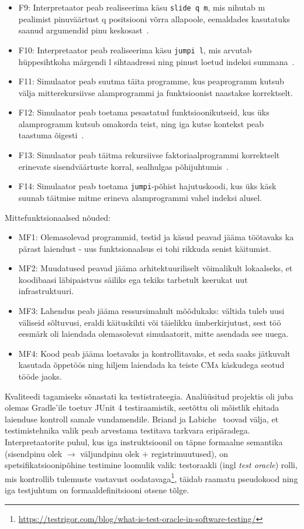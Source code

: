 \begin{itemize}
	\item F9: Interpretaator peab realiseerima käsu \verb|slide q m|, mis nihutab m pealimist pinuväärtust q positsiooni võrra allapoole, eemaldades kasutatuks saanud argumendid pinu keskosast~\cite{wilhelm_imperative_2010}.
	\item F10: Interpretaator peab realiseerima käsu \verb|jumpi l|, mis arvutab hüppesihtkoha märgendi l sihtaadressi ning pinust loetud indeksi summana~\cite{wilhelm_imperative_2010}.
	\item F11: Simulaator peab suutma täita programme, kus peaprogramm kutsub välja mitterekursiivse alamprogrammi ja funktsioonist naastakse korrektselt.
	\item F12: Simulaator peab toetama pesastatud funktsioonikutseid, kus üks alamprogramm kutsub omakorda teist, ning iga kutse kontekst peab taastuma õigesti~\cite{mogensen_programming_2026}.
	\item F13: Simulaator peab täitma rekursiivse faktoriaalprogrammi korrektselt erinevate sisendväärtuste korral, sealhulgas põhijuhtumis~\cite{wilhelm_imperative_2010}.
	\item F14: Simulaator peab toetama \verb|jumpi|-põhist hajutuskoodi, kus üks käsk suunab täitmise mitme erineva alamprogrammi vahel indeksi alusel.
\end{itemize}

Mittefunktsionaalsed nõuded:

\begin{itemize}
	\item MF1: Olemasolevad programmid, testid ja käsud peavad jääma töötavaks ka pärast laiendust - uus funktsionaalsus ei tohi rikkuda senist käitumist.
	\item MF2: Muudatused peavad jääma arhitektuuriliselt võimalikult lokaalseks, et koodibaasi läbipaistvus säiliks ega tekiks tarbetult keerukat uut infrastruktuuri.
	\item MF3: Lahendus peab jääma ressursimahult mõõdukaks: vältida tuleb uusi väliseid sõltuvusi, eraldi käituskihti või täielikku ümberkirjutust, sest töö eesmärk oli laiendada olemasolevat simulaatorit, mitte asendada see uuega.
	\item MF4: Kood peab jääma loetavaks ja kontrollitavaks, et seda saaks jätkuvalt kasutada õppetöös ning hiljem laiendada ka teiste \textsc{CMa} käskudega seotud tööde jaoks.
\end{itemize}

Kvaliteedi tagamiseks sõnastati ka testistrateegia. Analüüsitud projektis oli juba olemas Gradle'ile toetuv JUnit 4 testiraamistik, seetõttu oli mõistlik ehitada laienduse kontroll samale vundamendile. Briand ja Labiche~\cite{briand_empirical_2004} toovad välja, et testimistehnika valik peab arvestama testitava tarkvara eripäradega. Interpretaatorite puhul, kus iga instruktsioonil on täpne formaalne semantika (sisendpinu olek $\to$ väljundpinu olek $+$ registrimuutused), on spetsifikatsioonipõhine testimine loomulik valik: testoraakli (ingl \emph{test oracle}) rolli, mis kontrollib tulemuste vastavust oodatavaga\footnote{\url{https://testrigor.com/blog/what-is-test-oracle-in-software-testing/}}, täidab raamatu pseudokood ning iga testjuhtum on formaaldefinitsiooni otsene tõlge.

